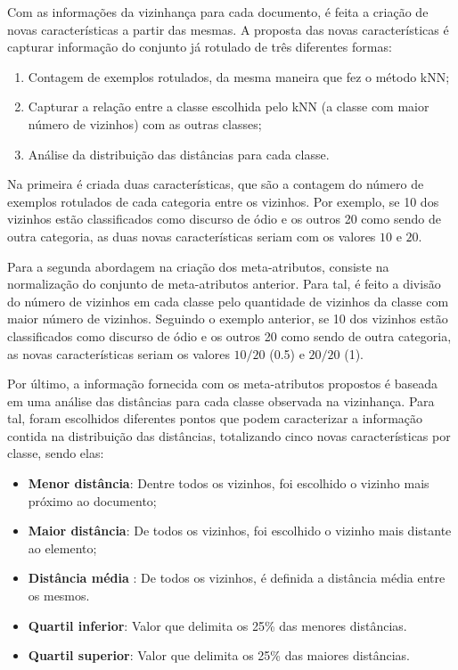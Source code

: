 Com as informações da vizinhança para cada documento, é feita a criação de novas características a partir das mesmas. A proposta das novas características é capturar informação do conjunto já rotulado de três diferentes formas:

\begin{enumerate}
    \item Contagem de exemplos rotulados, da mesma maneira que fez o método kNN;
    \item Capturar a relação entre a classe escolhida pelo kNN (a classe com maior número de vizinhos) com as outras classes;
    \item Análise da distribuição das distâncias para cada classe.
\end{enumerate}

Na primeira é criada duas características, que são a contagem do número de exemplos rotulados de cada categoria entre os vizinhos. Por exemplo, se 10 dos vizinhos estão classificados como discurso de ódio e os outros 20 como sendo de outra categoria, as duas novas características seriam com os valores $10$ e $20$.

Para a segunda abordagem na criação dos meta-atributos, consiste na normalização do conjunto de meta-atributos anterior. Para tal, é feito a divisão do número de vizinhos em cada classe pelo quantidade de vizinhos da classe com maior número de vizinhos. Seguindo o exemplo anterior, se 10 dos vizinhos estão classificados como discurso de ódio e os outros 20 como sendo de outra categoria, as novas características seriam os valores $10/20$ (0.5) e $20/20$ (1).

Por último,  a informação fornecida com os meta-atributos propostos é baseada em uma análise das distâncias para cada classe observada na vizinhança. Para tal, foram escolhidos diferentes pontos que podem caracterizar a informação contida na distribuição das distâncias, totalizando cinco novas características por classe, sendo elas:
\begin{itemize}
    \item {\bf Menor distância}: Dentre todos os vizinhos, foi escolhido o vizinho mais próximo ao documento;
    \item {\bf Maior distância}: De todos os vizinhos, foi escolhido o vizinho mais distante  ao elemento;
    \item {\bf Distância média }: De todos os vizinhos, é definida a distância média entre os mesmos.
    \item {\bf Quartil inferior}: Valor que delimita os 25\% das menores distâncias.
    \item {\bf Quartil superior}: Valor que delimita os 25\% das maiores distâncias.
\end{itemize}

